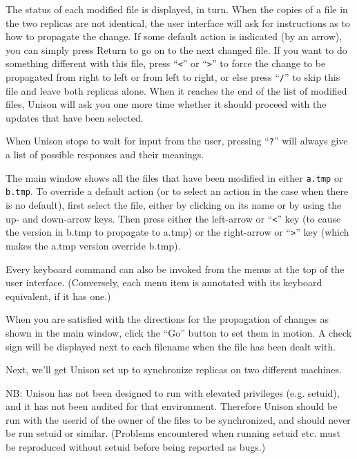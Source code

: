 \documentclass{article}
\begin{document}
\begin{textui}
The status of each modified file is displayed, in turn.
When the copies of a file in the two replicas are not identical, the
user interface will ask for instructions as to how to propagate the
change.  If some default action is indicated (by an arrow), you can
simply press Return to go on to the next changed file.  If you want to
do something different with this file, press ``\verb|<|'' or ``\verb|>|'' to force
the change to be propagated from right to left or from left to right,
or else press ``\verb|/|'' to skip this file and leave both replicas alone.
When it reaches the end of the list of modified files, Unison will ask
you one more time whether it should proceed with the updates that have
been selected.

When Unison stops to wait for input from the user, pressing ``\verb|?|''
will always give a list of possible responses and their meanings.
\end{textui}

\begin{tkui}
The main window shows all the files that have been modified in either
{\tt a.tmp} or {\tt b.tmp}.  To override a default action (or to select
an action in the case when there is no default), first select the file, either
by clicking on its name or by using the up- and down-arrow keys.  Then
press either the left-arrow or ``\verb|<|'' key (to cause the version in b.tmp to
propagate to a.tmp) or the right-arrow or ``\verb|>|'' key (which makes the a.tmp
version override b.tmp).

Every keyboard command can also be invoked from the menus at the top
of the user interface.  (Conversely, each menu item is annotated with
its keyboard equivalent, if it has one.)

When you are satisfied with the directions for the propagation of changes
as shown in the main window, click the ``Go'' button to set them in
motion.  A check sign will be displayed next to each filename
when the file has been dealt with.
\end{tkui}



Next, we'll get Unison set up to synchronize replicas on two different
machines.

NB: Unison has not been designed to run with elevated privileges
(e.g. setuid), and it has not been audited for that environment.
Therefore Unison should be run with the userid of the owner of the
files to be synchronized, and should never be run setuid or similar.
(Problems encountered when running setuid etc. must be reproduced
without setuid before being reported as bugs.)
\end{document}
